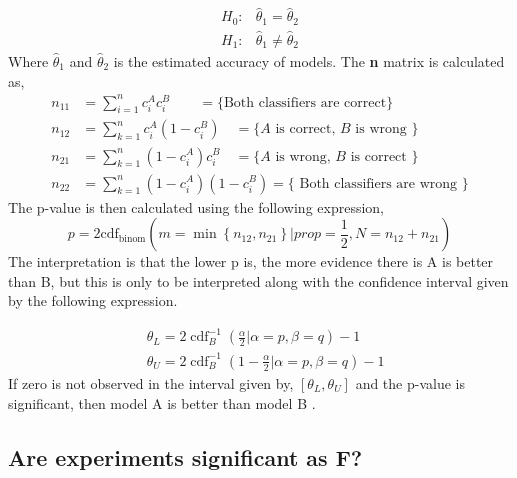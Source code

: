 \documentclass[11pt, fleqn, titlepage]{article}
\begin{document}
\begin{align*}\label{key}
H_0 : & \hat \theta_1 =  \hat \theta_2 \\
H_1 : & \hat \theta_1 \neq  \hat \theta_2
\end{align*}
Where $ \hat \theta_1 $ and $ \hat \theta_2  $ is the estimated accuracy of models. The \textbf{n} matrix is calculated as, 
\begin{equation*}\label{key}
\begin{aligned}
n_{11} &=\sum_{i=1}^{n} c_{i}^{A} c_{i}^{B} \qquad= \{ \text{Both classifiers are correct} \} \\
n_{12} &=\sum_{k=1}^{n} c_{i}^{A}\left(1-c_{i}^{B}\right) \quad=\{A \text { is correct, } B \text { is wrong }\} \\
n_{21} &=\sum_{k=1}^{n}\left(1-c_{i}^{A}\right) c_{i}^{B} \quad=\{A \text { is wrong, } B \text { is correct }\} \\
n_{22} &=\sum_{k=1}^{n}\left(1-c_{i}^{A}\right)\left(1-c_{i}^{B}\right)=\{\text { Both classifiers are wrong }\}
\end{aligned}
\end{equation*}
\noindent
The p-value is then calculated using the following expression, 
\begin{equation}\label{key}
p=2 \mathrm{cdf}_{\mathrm{binom}}\left(m=\min \left\{n_{12}, n_{21}\right\} | prop=\frac{1}{2}, N=n_{12}+n_{21}\right)
\end{equation}
\noindent
The interpretation is that the lower p is, the more evidence there is A is better than B,
but this is only to be interpreted along with the confidence interval given by the following expression.

\begin{equation}\label{key}
\begin{aligned}
&\theta_{L}=2 \operatorname{cdf}_{B}^{-1}\left(\frac{\alpha}{2} | \alpha=p, \beta=q\right)-1\\
&\theta_{U}=2 \operatorname{cdf}_{B}^{-1}\left(1-\frac{\alpha}{2} | \alpha=p, \beta=q\right)-1
\end{aligned}
\end{equation}
\noindent
If zero is not observed in the interval given by, $ [\theta_{L},\theta_{U}] $ and the p-value is significant, then model A is better than model B \cite{mlbog}.

\subsection*{Are experiments significant as F?}
\end{document}

